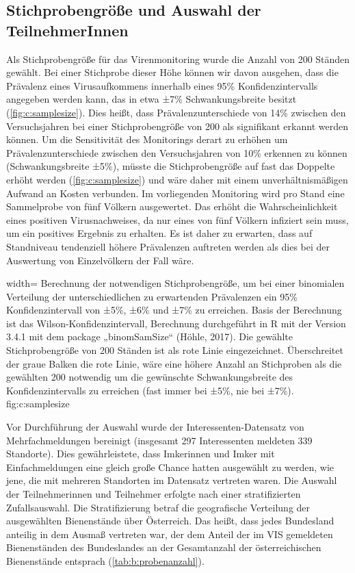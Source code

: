 

\subsection{Stichprobengröße und Auswahl der TeilnehmerInnen} \label{chap:auswahl}

Als Stichprobengröße für das Virenmonitoring wurde die Anzahl von 200 Ständen gewählt. Bei einer Stichprobe dieser Höhe können wir davon ausgehen, dass die Prävalenz eines Virusaufkommens innerhalb eines 95\% Konfidenzintervalls angegeben werden kann, das in etwa ±7\% Schwankungsbreite besitzt (\cref{fig:c:samplesize}). Dies heißt, dass Prävalenzunterschiede von 14\% zwischen den Versuchsjahren bei einer Stichprobengröße von 200 als signifikant erkannt werden können. Um die Sensitivität des Monitorings derart zu erhöhen um Prävalenzunterschiede zwischen den Versuchsjahren von 10\% erkennen zu können (Schwankungsbreite ±5\%), müsste die Stichprobengröße auf fast das Doppelte erhöht werden (\cref{fig:c:samplesize}) und wäre daher mit einem unverhältnismäßigen Aufwand an Kosten verbunden. Im vorliegenden Monitoring wird pro Stand eine Sammelprobe von fünf Völkern ausgewertet. Das erhöht die Wahrscheinlichkeit eines positiven Virusnachweises, da nur eines von fünf Völkern infiziert sein muss, um ein positives Ergebnis zu erhalten. Es ist daher zu erwarten, dass auf Standniveau tendenziell höhere Prävalenzen auftreten werden als dies bei der Auswertung von Einzelvölkern der Fall wäre.

  {width=\textwidth} %
  {Berechnung der notwendigen Stichprobengröße, um bei einer binomialen Verteilung der unterschiedlichen zu erwartenden Prävalenzen ein 95\% Konfidenzintervall von ±5\%, ±6\% und ±7\% zu erreichen. Basis der Berechnung ist das Wilson-Konfidenzintervall, Berechnung durchgeführt in R mit der Version 3.4.1 \citep{rcoreteam2020} mit dem package „binomSamSize“ (Höhle, 2017). Die gewählte Stichprobengröße von 200 Ständen ist als rote Linie eingezeichnet. Überschreitet der graue Balken die rote Linie, wäre eine höhere Anzahl an Stichproben als die gewählten 200 notwendig um die gewünschte Schwankungsbreite des Konfidenzintervalls zu erreichen (fast immer bei ±5\%, nie bei ±7\%).} %
  {} %
  {fig:c:samplesize} %

Vor Durchführung der Auswahl wurde der Interessenten-Datensatz von Mehrfachmeldungen bereinigt (insgesamt 297 Interessenten meldeten 339 Standorte). Dies gewährleistete, dass Imkerinnen und Imker mit Einfachmeldungen eine gleich große Chance hatten ausgewählt zu werden, wie jene, die mit mehreren Standorten im Datensatz vertreten waren. Die Auswahl der Teilnehmerinnen und Teilnehmer erfolgte nach einer stratifizierten Zufallsauswahl. Die Stratifizierung betraf die geografische Verteilung der ausgewählten Bienenstände über Österreich. Das heißt, dass jedes Bundesland anteilig in dem Ausmaß vertreten war, der dem Anteil der im VIS gemeldeten Bienenständen des Bundeslandes an der Gesamtanzahl der österreichischen Bienenstände entsprach (\cref{tab:b:probenanzahl}).

